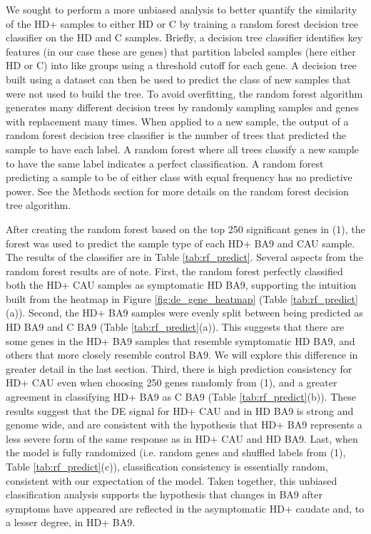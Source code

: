 \documentclass[fleqn,10pt,table]{wlscirep}
\begin{document}
We sought to perform a more unbiased analysis to better quantify the similarity of the HD+ samples to either HD or C by training a random forest decision tree classifier on the HD and C samples.
Briefly, a decision tree classifier identifies key features (in our case these are genes) that partition labeled samples (here either HD or C) into like groups using a threshold cutoff for each gene.
A decision tree built using a dataset can then be used to predict the class of new samples that were not used to build the tree.
To avoid overfitting, the random forest algorithm generates many different decision trees by randomly sampling samples and genes with replacement many times.
When applied to a new sample, the output of a random forest decision tree classifier is the number of trees that predicted the sample to have each label.
A random forest where all trees classify a new sample to have the same label indicates a perfect classification.
A random forest predicting a sample to be of either class with equal frequency has no predictive power.
See the Methods section for more details on the random forest decision tree algorithm.

After creating the random forest based on the top 250 significant genes in (1), the forest was used to predict the sample type of each HD+ BA9 and CAU sample.
The results of the classifier are in Table \ref{tab:rf_predict}.
Several aspects from the random forest results are of note.
First, the random forest perfectly classified both the HD+ CAU samples as symptomatic HD BA9, supporting the intuition built from the heatmap in Figure \ref{fig:de_gene_heatmap} (Table \ref{tab:rf_predict}(a)).
Second, the HD+ BA9 samples were evenly split between being predicted as HD BA9 and C BA9 (Table \ref{tab:rf_predict}(a)).
This suggests that there are some genes in the HD+ BA9 samples that resemble symptomatic HD BA9, and others that more closely resemble control BA9.
We will explore this difference in greater detail in the last section.
Third, there is high prediction consistency for HD+ CAU even when choosing 250 genes randomly from (1), and a greater agreement in classifying HD+ BA9 as C BA9 (Table \ref{tab:rf_predict}(b)).
These results suggest that the DE signal for HD+ CAU and in HD BA9 is strong and genome wide, and are consistent with the hypothesis that HD+ BA9 represents a less severe form of the same response as in HD+ CAU and HD BA9.
Last, when the model is fully randomized (i.e. random genes and shuffled labels from (1), Table \ref{tab:rf_predict}(c)), classification consistency is essentially random, consistent with our expectation of the model.
Taken together, this unbiased classification analysis supports the hypothesis that changes in BA9 after symptoms have appeared are reflected in the asymptomatic HD+ caudate and, to a lesser degree, in HD+ BA9.
\end{document}
